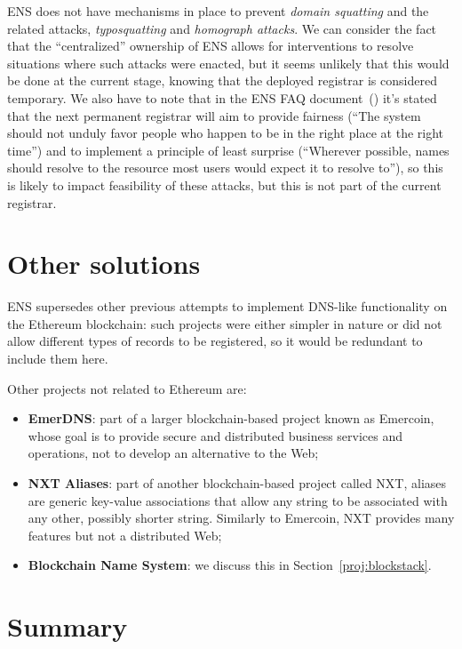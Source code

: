 \documentclass[mscthesis]{usiinfthesis}
\begin{document}
ENS does not have mechanisms in place to prevent \emph{domain squatting} and the related attacks, \emph{typosquatting} and \emph{homograph attacks}. We can consider the fact that the ``centralized'' ownership of ENS allows for interventions to resolve situations where such attacks were enacted, but it seems unlikely that this would be done at the current stage, knowing that the deployed registrar is considered temporary. We also have to note that in the ENS FAQ document~(\cite{website:ensfaq}) it's stated that the next permanent registrar will aim to provide fairness (``The system should not unduly favor people who happen to be in the right place at the right time'') and to implement a principle of least surprise (``Wherever possible, names should resolve to the resource most users would expect it to resolve to''), so this is likely to impact feasibility of these attacks, but this is not part of the current registrar.

\section{Other solutions}
ENS supersedes other previous attempts to implement DNS-like functionality on the Ethereum blockchain: such projects were either simpler in nature or did not allow different types of records to be registered, %
so it would be redundant to include them here.

Other projects not related to Ethereum are:
\begin{itemize}
	\item \textbf{EmerDNS}: part of a larger blockchain-based project known as Emercoin, whose goal is to provide secure and distributed business services and operations, not to develop an alternative to the Web; %
	\item \textbf{NXT Aliases}: part of another blockchain-based project called NXT, aliases are  generic key-value associations that allow any string to be associated with any other, possibly shorter string. Similarly to Emercoin, NXT provides many features but not a distributed Web;
	\item \textbf{Blockchain Name System}: we discuss this in Section~\ref{proj:blockstack}.
\end{itemize}


\section{Summary}
\end{document}
